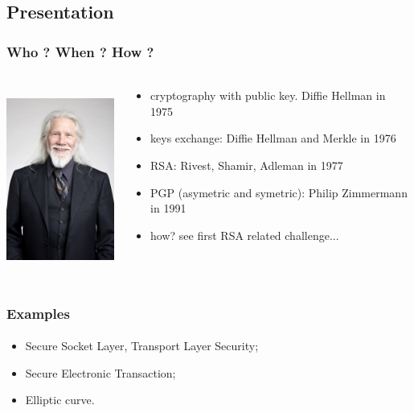 \documentclass[]{beamer}
\begin{document}
\subsection{Presentation}
\begin{frame}
\frametitle{Who ? When ? How ?}
\framesubtitle{}
\begin{columns}
\begin{column}{5cm}
\begin{center}
\includegraphics[height=6.0cm, width=4.0cm]{./images/Whitfield_Diffie_Royal_Society.jpg}
\end{center}
\end{column}
\begin{column}{5cm}
\begin{itemize}
    \item cryptography with public key. Diffie Hellman in 1975
    \item keys exchange: Diffie Hellman and Merkle in 1976
    \item RSA: Rivest, Shamir, Adleman in 1977
    \item PGP (asymetric and symetric): Philip Zimmermann in 1991
    \item how? see first RSA related challenge...
\end{itemize}
\end{column}
\end{columns}
\end{frame}

\begin{frame}
\frametitle{Examples}
\framesubtitle{}
\begin{itemize}
    \item Secure Socket Layer, Transport Layer Security;
    \item Secure Electronic Transaction;
    \item Elliptic curve.
\end{itemize}
\end{frame}
\end{document}
